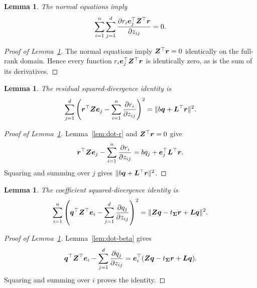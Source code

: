 \documentclass{article}
\theoremstyle{plain} %
\newtheorem{lemma}[theorem]{Lemma}
\theoremstyle{definition} %
\theoremstyle{definition} %
\begin{document}
\begin{lemma}\label{lem:dot-rxr}
The normal equations imply
\begin{align*}
    \sum_{i=1}^n\sum_{j=1}^d
       \pdv{r_i\boldsymbol{e}_j^\top\boldsymbol{Z}^\top\boldsymbol{r}}{z_{ij}}=0.
\end{align*}
\end{lemma}

\begin{proof}[Proof of Lemma~\ref{lem:dot-rxr}]
The normal equations imply $\boldsymbol{Z}^\top\boldsymbol{r}=0$ identically on the full-rank
domain.  Hence every function $r_i\boldsymbol{e}_j^\top\boldsymbol{Z}^\top\boldsymbol{r}$ is identically
zero, as is the sum of its derivatives.
\end{proof}

\begin{lemma}\label{lem:dot-rxxr}
The residual squared-divergence identity is
\begin{align*}
    \sum_{j=1}^d\left(
       \boldsymbol{r}^\top\boldsymbol{Z}\boldsymbol{e}_j-\sum_{i=1}^n\pdv{r_i}{z_{ij}}
    \right)^2
    =\lVert b\boldsymbol{q}+\boldsymbol{L}^\top\boldsymbol{r}\rVert^2.
\end{align*}
\end{lemma}

\begin{proof}[Proof of Lemma~\ref{lem:dot-rxxr}]
Lemma~\ref{lem:dot-r} and $\boldsymbol{Z}^\top\boldsymbol{r}=0$ give
\begin{align*}
    \boldsymbol{r}^\top\boldsymbol{Z}\boldsymbol{e}_j-\sum_{i=1}^n\pdv{r_i}{z_{ij}}
    =bq_j+\boldsymbol{e}_j^\top\boldsymbol{L}^\top\boldsymbol{r}.
\end{align*}
Squaring and summing over $j$ gives $\lVert b\boldsymbol{q}+\boldsymbol{L}^\top\boldsymbol{r}\rVert^2$.
\end{proof}

\begin{lemma}\label{lem:dot-hxxh}
The coefficient squared-divergence identity is
\begin{align*}
    \sum_{i=1}^n\left(
       \boldsymbol{q}^\top\boldsymbol{Z}^\top\boldsymbol{e}_i-\sum_{j=1}^d\pdv{q_j}{z_{ij}}
    \right)^2
    =\lVert\boldsymbol{Z}\boldsymbol{q}-t_{\boldsymbol{\Sigma}}\boldsymbol{r}+\boldsymbol{L}\boldsymbol{q}\rVert^2.
\end{align*}
\end{lemma}

\begin{proof}[Proof of Lemma~\ref{lem:dot-hxxh}]
Lemma~\ref{lem:dot-beta} gives
\begin{align*}
    \boldsymbol{q}^\top\boldsymbol{Z}^\top\boldsymbol{e}_i-\sum_{j=1}^d\pdv{q_j}{z_{ij}}
    =\boldsymbol{e}_i^\top(\boldsymbol{Z}\boldsymbol{q}-t_{\boldsymbol{\Sigma}}\boldsymbol{r}+\boldsymbol{L}\boldsymbol{q}).
\end{align*}
Squaring and summing over $i$ proves the identity.
\end{proof}
\end{document}
